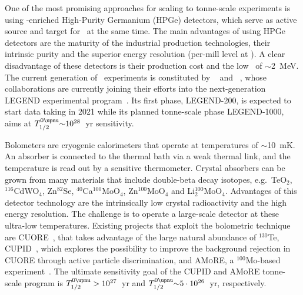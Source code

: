 \begin{description}[wide]
  \item[Semiconductors] One of the most promising approaches for scaling to
    tonne-scale experiments is using \gesix-enriched High-Purity Germanium
    (HPGe) detectors, which serve as active source and target for \onbb\ at the
    same time. The main advantages of using HPGe detectors are the maturity of
    the industrial production technologies, their intrinsic purity and the
    superior energy resolution (per-mill level at \qbb).  A clear disadvantage
    of these detectors is their production cost and the low \qbb\ of
    $\sim$2~MeV. The current generation of \gesix\ experiments is constituted
    by \gerda~\cite{Budjas2013} and \majoranademo~\cite{Abgrall2014}, whose
    collaborations are currently joining their efforts into the next-generation
    LEGEND experimental program~\cite{Abgrall2017}. Its first phase, LEGEND-200,
    is expected to start data taking in 2021 while its planned tonne-scale phase
    LEGEND-1000, aims at $\thalfzeroM {\sim}10^{28}$~yr sensitivity.

  \item[Bolometers] Bolometers are cryogenic calorimeters that operate at
    temperatures of $\sim$10~mK. An absorber is connected to the thermal bath
    via a weak thermal link, and the temperature is read out by a sensitive
    thermometer. Crystal absorbers can be grown from many materials that
    include double-beta decay isotopes, e.g.~TeO$_2$, $^{116}$CdWO$_4$,
    Zn$^{82}$Se, $^{40}$Ca$^{100}$MoO$_4$, Zn$^{100}$MoO$_4$ and
    Li$_2^{100}$MoO$_4$.  Advantages of this detector technology are the
    intrinsically low crystal radioactivity and the high energy resolution. The
    challenge is to operate a large-scale detector at these ultra-low
    temperatures. Existing projects that exploit the bolometric technique are
    CUORE~\cite{Arnaboldi2002, Artusa2014}, that takes advantage of the large
    natural abundance of $^{130}$Te, CUPID~\cite{Wang2015}, which explores the
    possibility to improve the background rejection in CUORE through active
    particle discrimination, and \textsc{AMoRE}, a $^{100}$Mo-based
    experiment~\cite{Kim2015}. The ultimate sensitivity goal of the CUPID and
    \textsc{AMoRE} tonne-scale program is $\thalfzeroM > 10^{27}$~yr and
    $\thalfzeroM {\sim}5 \cdot 10^{26}$~yr, respectively.


\end{description}
